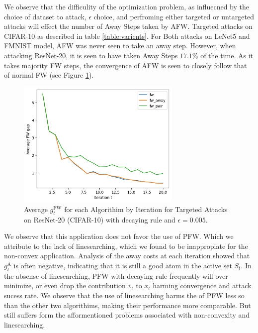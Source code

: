 \documentclass{article}
\begin{document}
We observe that the difficulity of the optimization problem, as influecned by the choice of dataset to attack, $\epsilon$ choice, and perfroming either targeted or untargeted attacks will effect the number of Away Steps taken by AFW. Targeted attacks on CIFAR-10 as described in table \ref{table:varients}. For Both attacks on LeNet5 and FMNIST model, AFW was never seen to take an away step. However, when attacking ResNet-20, it is seen to have taken Away Steps $17.1\%$ of the time. As it takes majority FW steps, the convergence of AFW is seen to closely follow that of normal FW (see Figure \ref{fig:converge-compare}).

\begin{figure}[H]
    \centering
    \includegraphics[width=0.7\textwidth]{plots/mdl_compare_avg_FWgap_by_iter.png}
    \caption{Average $g^\text{FW}_t$ for each Algorithim by Iteration for Targeted Attacks on ResNet-20 (CIFAR-10) with decaying rule and $\epsilon = 0.005$.}
    \label{fig:converge-compare}
\end{figure}

We observe that this application does not favor the use of PFW. Which we attribute to the lack of linesearching, which we found to be inappropiate for the non-convex application. Analysis of the away costs at each iteration showed that $g_t^\text{A}$ is often negative, indicating that it is still a good atom in the active set $S_t$. In the absense of linesearching, PFW with decaying rule frequently will over minimize, or even drop the contribution $v_t$ to $x_t$ harming convergence and attack sucess rate. We observe that the use of linesearching harms the  of PFW less so than the other two algorithims, making their performance more comparable. But still suffers form the afformentioned problems associated with non-convexity and linesearching.
\end{document}
